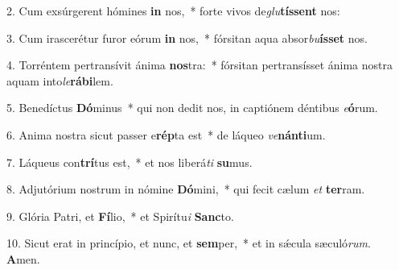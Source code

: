 2. Cum exsúrgerent hómines \textbf{in} nos,~*  forte vivos de\textit{glu}\textbf{tís}\textbf{sent} nos:\

3. Cum irascerétur furor eórum \textbf{in} nos,~*  fórsitan aqua absor\textit{bu}\textbf{ís}\textbf{set} nos.\

4. Torréntem pertransívit ánima \textbf{nos}tra:~*  fórsitan pertransísset ánima nostra aquam into\textit{le}\textbf{rá}\textbf{bi}lem.\

5. Benedíctus \textbf{Dó}minus~*  qui non dedit nos, in captiónem déntibus \textit{e}\textbf{ó}rum.\

6. Anima nostra sicut passer e\textbf{rép}ta est~*  de láqueo \textit{ve}\textbf{nán}\textbf{ti}um.\

7. Láqueus con\textbf{trí}tus est,~*  et nos liberá\textit{ti} \textbf{su}mus.\

8. Adjutórium nostrum in nómine \textbf{Dó}mini,~*  qui fecit cælum \textit{et} \textbf{ter}ram.\

9. Glória Patri, et \textbf{Fí}lio,~*  et Spirítu\textit{i} \textbf{Sanc}to.\

10. Sicut erat in princípio, et nunc, et \textbf{sem}per,~*  et in sǽcula sæculó\textit{rum}. \textbf{A}men.\

